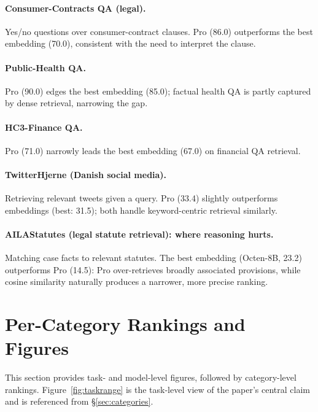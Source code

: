 \paragraph{Consumer-Contracts QA (legal).}
Yes/no questions over consumer-contract clauses.
Pro (86.0) outperforms the best embedding (70.0), consistent with the need to interpret the clause.

\paragraph{Public-Health QA.}
Pro (90.0) edges the best embedding (85.0); factual health QA is partly captured by dense retrieval, narrowing the gap.

\paragraph{HC3-Finance QA.}
Pro (71.0) narrowly leads the best embedding (67.0) on financial QA retrieval.

\paragraph{TwitterHjerne (Danish social media).}
Retrieving relevant tweets given a query.
Pro (33.4) slightly outperforms embeddings (best: 31.5); both handle keyword-centric retrieval similarly.

\paragraph{AILAStatutes (legal statute retrieval): where reasoning hurts.}
Matching case facts to relevant statutes.
The best embedding (Octen-8B, 23.2) outperforms Pro (14.5): Pro over-retrieves broadly associated provisions, while cosine similarity naturally produces a narrower, more precise ranking.



\section{Per-Category Rankings and Figures}
\label{app:category_rankings}

This section provides task- and model-level figures, followed by category-level rankings.
Figure~\ref{fig:taskrange} is the task-level view of the paper's central claim and is referenced from \S\ref{sec:categories}.

